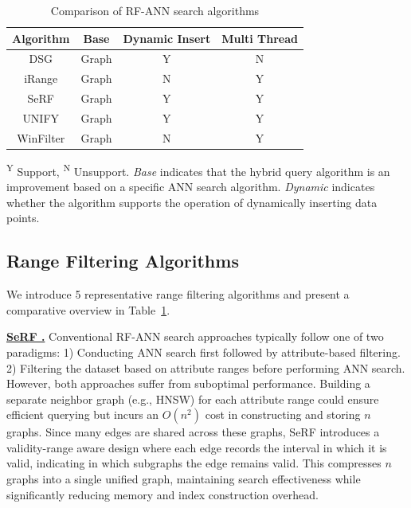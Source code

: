 \documentclass[sigconf, nonacm]{acmart}
\begin{document}
	
	\setlength{\textfloatsep}{0.1cm}
	\setlength{\floatsep}{0cm}
		\renewcommand{\arraystretch}{0.9}
	\begin{table}[t]
		\centering
		\setlength{\abovecaptionskip}{0.1cm}
		\setlength{\belowcaptionskip}{-0.1cm}
		\setlength{\textfloatsep}{0.1cm}
		\caption{Comparison of RF-ANN search algorithms}
		\small	%
		\label{tab:range_algo}
		\begin{tabular}{|c|c|c|c|}
			\hline
			\textbf{Algorithm} & \textbf{Base} & \textbf{Dynamic Insert} & \textbf{Multi Thread} \\
			\hline
			DSG & Graph & Y & N \\
			iRange & Graph & N & Y \\
			SeRF & Graph & Y & Y \\
			UNIFY & Graph & Y & Y \\
			WinFilter & Graph & N & Y  \\
			\hline
		\end{tabular}
		
		
		\footnotesize{
			\begin{minipage}{\linewidth}
				\textsuperscript{Y} Support, 
				\textsuperscript{N} Unsupport.
				\textit{Base} indicates that the hybrid query algorithm is an improvement based on a specific ANN search algorithm. 
				\textit{Dynamic} indicates whether the algorithm supports the operation of dynamically inserting data points.
			\end{minipage} 
			\vspace{-0.1cm}
		}
		
	\end{table}
	
	\subsection{Range Filtering Algorithms}
	
	We introduce 5 representative range filtering algorithms and present a comparative overview in Table~\ref{tab:range_algo}.
	
	
	\noindent\textbf{\underline{SeRF \cite{serf}.}}  
	Conventional RF-ANN search approaches typically follow one of two paradigms: 1) Conducting ANN search first followed by attribute-based filtering. 2) Filtering the dataset based on attribute ranges before performing ANN search. However, both approaches suffer from suboptimal performance. Building a separate neighbor graph (e.g., HNSW) for each attribute range could ensure efficient querying but incurs an $O(n^2)$ cost in constructing and storing $n$ graphs. Since many edges are shared across these graphs, SeRF introduces a validity-range aware design where each edge records the interval in which it is valid, indicating in which subgraphs the edge remains valid. This compresses $n$ graphs into a single unified graph, maintaining search effectiveness while significantly reducing memory and index construction overhead.
	
\end{document}
